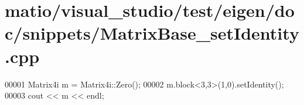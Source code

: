 \hypertarget{matio_2visual__studio_2test_2eigen_2doc_2snippets_2_matrix_base__set_identity_8cpp_source}{}\section{matio/visual\+\_\+studio/test/eigen/doc/snippets/\+Matrix\+Base\+\_\+set\+Identity.cpp}
\label{matio_2visual__studio_2test_2eigen_2doc_2snippets_2_matrix_base__set_identity_8cpp_source}

\begin{DoxyCode}
00001 Matrix4i m = Matrix4i::Zero();
00002 m.block<3,3>(1,0).setIdentity();
00003 cout << m << endl;
\end{DoxyCode}
